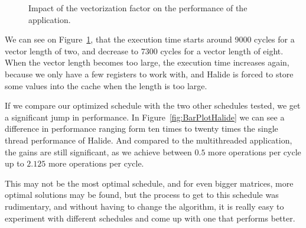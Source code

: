 \begin{figure}[H]
    \begin{center}
    \resizebox{10cm}{!}{}
    \label{Fig:Vectorization}
        \caption{Impact of the vectorization factor on the performance of the application.}
        \label{fig:Vectorization}
    \end{center}
\end{figure}

    We can see on Figure~\ref{fig:Vectorization}, that the execution time starts around 9000 cycles for a vector length of two, and decrease to 7300 cycles for a vector length of eight.
    When the vector length becomes too large, the execution time increases again, because we only have a few registers to work with, and Halide is forced to store some values into the cache when the length is too large.


    If we compare our optimized schedule with the two other schedules tested, we get a significant jump in performance.
    In Figure~\ref{fig:BarPlotHalide} we can see a difference in performance ranging form ten times to twenty times the single thread performance of Halide.
    And compared to the multithreaded application, the gains are still significant, as we achieve between $0.5$ more operations per cycle up to $2.125$ more operations per cycle.


    This may not be the most optimal schedule, and for even bigger matrices, more optimal solutions may be found, but the process to get to this schedule was rudimentary, and without having to change the algorithm, it is really easy to experiment with different schedules and come up with one that performs better.
